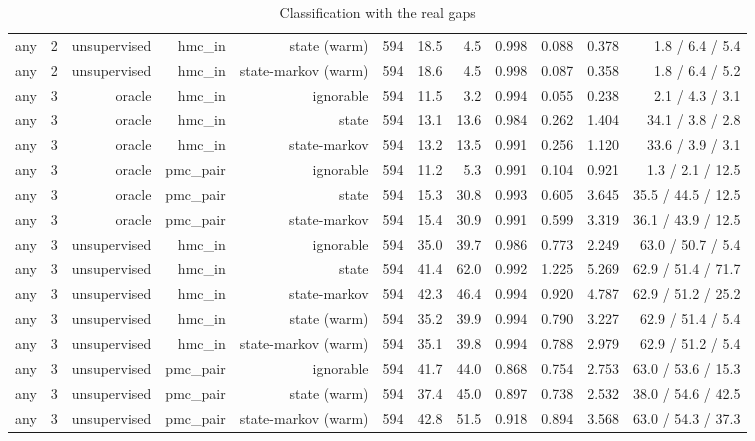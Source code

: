 \begin{table}[ht]
\begin{tabular}{llrrrrrrrrrr}
any & 2 & unsupervised & hmc\_in & state (warm) & 594 & 18.5 & 4.5 & 0.998 & 0.088 & 0.378 & 1.8 / 6.4 / 5.4 \\
any & 2 & unsupervised & hmc\_in & state-markov (warm) & 594 & 18.6 & 4.5 & 0.998 & 0.087 & 0.358 & 1.8 / 6.4 / 5.2 \\
any & 3 & oracle & hmc\_in & ignorable & 594 & 11.5 & 3.2 & 0.994 & 0.055 & 0.238 & 2.1 / 4.3 / 3.1 \\
any & 3 & oracle & hmc\_in & state & 594 & 13.1 & 13.6 & 0.984 & 0.262 & 1.404 & 34.1 / 3.8 / 2.8 \\
any & 3 & oracle & hmc\_in & state-markov & 594 & 13.2 & 13.5 & 0.991 & 0.256 & 1.120 & 33.6 / 3.9 / 3.1 \\
any & 3 & oracle & pmc\_pair & ignorable & 594 & 11.2 & 5.3 & 0.991 & 0.104 & 0.921 & 1.3 / 2.1 / 12.5 \\
any & 3 & oracle & pmc\_pair & state & 594 & 15.3 & 30.8 & 0.993 & 0.605 & 3.645 & 35.5 / 44.5 / 12.5 \\
any & 3 & oracle & pmc\_pair & state-markov & 594 & 15.4 & 30.9 & 0.991 & 0.599 & 3.319 & 36.1 / 43.9 / 12.5 \\
any & 3 & unsupervised & hmc\_in & ignorable & 594 & 35.0 & 39.7 & 0.986 & 0.773 & 2.249 & 63.0 / 50.7 / 5.4 \\
any & 3 & unsupervised & hmc\_in & state & 594 & 41.4 & 62.0 & 0.992 & 1.225 & 5.269 & 62.9 / 51.4 / 71.7 \\
any & 3 & unsupervised & hmc\_in & state-markov & 594 & 42.3 & 46.4 & 0.994 & 0.920 & 4.787 & 62.9 / 51.2 / 25.2 \\
any & 3 & unsupervised & hmc\_in & state (warm) & 594 & 35.2 & 39.9 & 0.994 & 0.790 & 3.227 & 62.9 / 51.4 / 5.4 \\
any & 3 & unsupervised & hmc\_in & state-markov (warm) & 594 & 35.1 & 39.8 & 0.994 & 0.788 & 2.979 & 62.9 / 51.2 / 5.4 \\
any & 3 & unsupervised & pmc\_pair & ignorable & 594 & 41.7 & 44.0 & 0.868 & 0.754 & 2.753 & 63.0 / 53.6 / 15.3 \\
any & 3 & unsupervised & pmc\_pair & state (warm) & 594 & 37.4 & 45.0 & 0.897 & 0.738 & 2.532 & 38.0 / 54.6 / 42.5 \\
any & 3 & unsupervised & pmc\_pair & state-markov (warm) & 594 & 42.8 & 51.5 & 0.918 & 0.894 & 3.568 & 63.0 / 54.3 / 37.3 \\
\bottomrule
\end{tabular}
\caption{Classification with the real gaps}
\end{table}
